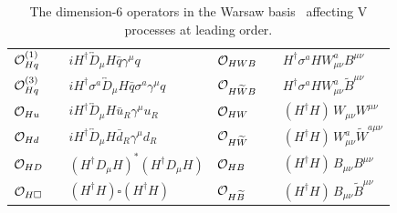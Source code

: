 \documentclass[a4paper,11pt]{article}
\renewcommand{\PV}{{{{V}}}\xspace}
\newcommand{\VH}{{{\PV}{\PH}}\xspace}
\begin{document}
\begin{table}[t]
\caption{
The dimension-6 operators in the Warsaw basis~\cite{Grzadkowski:2010es} affecting \VH  processes at leading order.
}
\begin{center}
{\renewcommand{\arraystretch}{1.3}
\begin{tabular}{lcl|lcl}
${\cal O}^{(1)}_{Hq}$&&$i H^\dagger \overleftrightarrow{D}_\mu H \bar{q}   \gamma^\mu q$&${\cal O}_{HWB}$&&$ H^\dagger \sigma^a H W^a_{\mu\nu}B^{\mu\nu}$ \\
\rule{0pt}{4ex} ${\cal O}^{(3)}_{Hq}$&&$i H^\dagger \sigma^a \overleftrightarrow{D}_\mu H \bar{q}  \sigma^a \gamma^\mu q$ &${\cal O}_{H\widetilde{W}B}$&&$ H^\dagger \sigma^a H W^a_{\mu\nu}\widetilde{B}^{\mu\nu}$\\
\rule{0pt}{4ex} ${\cal O}_{Hu}$&&$i H^\dagger \overleftrightarrow{D}_\mu H \bar{u}_R  \gamma^\mu u_R$&${\cal O}_{H{W}}$&&$(H^\dagger H)\,W_{\mu\nu}{W}^{\mu\nu}$\\
\rule{0pt}{4ex} ${\cal O}_{Hd}$&&$i H^\dagger \overleftrightarrow{D}_\mu H \bar{d}_R  \gamma^\mu d_R$&${\cal O}_{H\widetilde{W}}$&&$ (H^\dagger H)\, W^a_{\mu\nu}\widetilde{W}^{a \mu\nu}$\\
\rule{0pt}{4ex} ${\cal O}_{HD}$&&$(H^\dagger  {D}_\mu H)^*(H^\dagger  {D}_\mu H)$& ${\cal O}_{HB}$&&$(H^\dagger H)\,B_{\mu\nu}B^{\mu\nu}$\\
\rule{0pt}{4ex} ${\cal O}_{H\square}$&&$(H^\dagger H) \square (H^\dagger H)$& ${\cal O}_{H\widetilde{B}}$&&$(H^\dagger H)\,B_{\mu\nu}\widetilde{B}^{\mu\nu}$
\end{tabular}}
\label{Tab:Operators}
\end{center}
\end{table}
\end{document}
